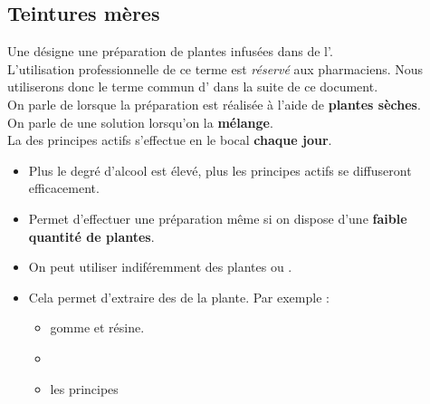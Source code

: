 \label{teinture}
\subsection{Teintures mères}

\begin{Defi}

    Une  désigne une préparation de plantes infusées dans de l'. \\
    L'utilisation professionnelle de ce terme est \textit{réservé} aux pharmaciens. Nous utiliserons donc le terme commun d' dans la suite de ce document.\\

    On parle de  lorsque la préparation est réalisée à l'aide de \textbf{plantes sèches}.\\

    On parle de  une solution lorsqu'on la \textbf{mélange}.\\

    La  des principes actifs s'effectue en  le bocal \textbf{chaque jour}. 
\end{Defi}
\begin{Remarque}[]%

    \begin{itemize}[label=\faPen]
        \item Plus le degré d'alcool est élevé, plus les principes actifs se diffuseront efficacement. 
        \item Permet d'effectuer une préparation même si on dispose d'une \textbf{faible quantité de plantes}. 
        \item On peut utiliser indiféremment des plantes  ou .
        \item Cela permet d'extraire des   de la plante. Par exemple :
                \begin{multicols}{3}
                    \begin{itemize}
                        \item gomme et résine.
                        \item {} 
                        \item les principes 
                    \end{itemize}
                \end{multicols}
    \end{itemize}
\end{Remarque}
